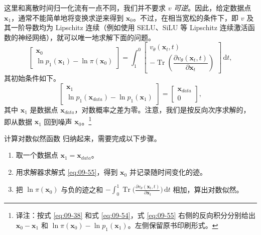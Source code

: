 这里和离散时间归一化流有一点不同，我们并不要求 $v$ \emph{可逆}。因此，给定数据点 $\mathbf x_1$，通常不能简单地将变换求逆来得到 $\mathbf x_0$。不过，在相当宽松的条件下，即 $v$ 及其一阶导数均为 Lipschitz 连续（例如使用 SELU、SiLU 等 Lipschitz 连续激活函数的神经网络），就可以唯一地求解下面的问题。
\begin{equation}
  \begin{bmatrix}
    \mathbf x_0\\
    \ln p_1(\mathbf x_1)-\ln\pi(\mathbf x_0)
  \end{bmatrix}=
  \int_1^0
  \begin{bmatrix}
    v_\theta(\mathbf x_t,t)\\
    -\operatorname{Tr}\left(\dfrac{\partial v_\theta(\mathbf x_t,t)}{\partial\mathbf x_t}\right)
  \end{bmatrix}\,\mathrm dt,
  \tag{9.55}\label{eq:09-55}
\end{equation}
其初始条件如下。
\begin{equation}
  \begin{bmatrix}
    \mathbf x_1\\
    \ln p_1(\mathbf x_{\mathit{data}})-\ln p_1(\mathbf x_1)
  \end{bmatrix}=
  \begin{bmatrix}
    \mathbf x_{\mathit{data}}\\
    0
  \end{bmatrix},
  \tag{9.56}\label{eq:09-56}
\end{equation}
其中 $\mathbf x_1$ 是数据点 $\mathbf x_{\mathit{data}}$，对数概率之差为零。注意，我们是按反向次序求解的，即从数据 $\mathbf x_1$ 回到噪声 $\mathbf x_0$。\footnote{译注：按式 \eqref{eq:09-38} 和式 \eqref{eq:09-54}，式 \eqref{eq:09-55} 右侧的反向积分分别给出 $\mathbf x_0-\mathbf x_1$ 和 $\ln\pi(\mathbf x_0)-\ln p_1(\mathbf x_1)$。左侧保留原书印刷形式。}

\begin{booknote}[colframe=blue!65!black,colback=blue!4]{计算对数似然函数}
归纳起来，需要完成以下步骤。
\begin{enumerate}
  \item 取一个数据点 $\mathbf x_1=\mathbf x_{\mathit{data}}$。
  \item 用求解器求解式 \eqref{eq:09-55}，得到 $\mathbf x_0$ 并记录随时间变化的迹。
  \item 把 $\ln\pi(\mathbf x_0)$ 与负的迹之和
    $-\int_0^1\operatorname{Tr}\bigl(\frac{\partial v_\theta(\mathbf x_t,t)}{\partial\mathbf x_t}\bigr)\,\mathrm dt$
    相加，算出对数似然。
\end{enumerate}
\end{booknote}

